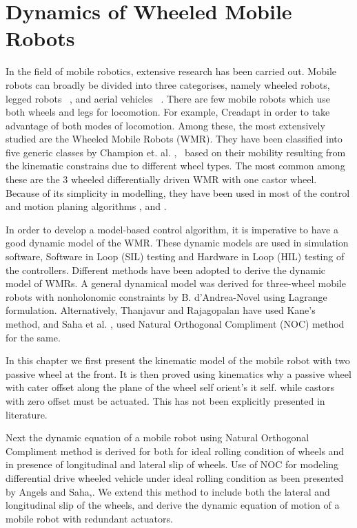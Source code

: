 \chapter{Dynamics of Wheeled Mobile Robots }
\label{c4_Dynamics}
In the field of mobile robotics, extensive research has been carried out. 
Mobile robots can broadly be divided into three categorises, namely wheeled robots, legged robots ~\cite{machado2006overview}, and aerial vehicles ~\cite{valavanis2014handbook}. 
There are few mobile robots which use both wheels and legs for locomotion. For example,  Creadapt  \cite{mouret2015evolutionary} in order to take advantage of both modes of locomotion. 
Among these, the most extensively studied are the  Wheeled Mobile Robots (WMR). 
They have been classified into five generic classes by Champion et. al. \cite{campion1996structural},~\cite{campion2008wheeled}  based on their mobility resulting from the kinematic constrains due to  different wheel types.
 The most common among these are the  3 wheeled differentially driven WMR with one castor wheel.
  Because of its simplicity in modelling, they have been used in most of the  control and motion planing algorithms  \cite{desantis1995modeling}, \cite{koh1999smooth} and \cite{d1995control}. 

In order to develop a model-based control algorithm, it is imperative to have a good dynamic model of the WMR.
 These dynamic models are used in  simulation software,  Software in Loop (SIL) testing and Hardware in Loop (HIL) testing  of the controllers.
 Different methods have  been adopted to derive the dynamic model of WMRs.
  A general dynamical model was derived for three-wheel mobile robots with nonholonomic constraints  by B. d'Andrea-Novel \cite{d1991modelling} using  Lagrange formulation.
    Alternatively, Thanjavur and Rajagopalan \cite{thanjavur1997ease} have used Kane's method,  and  Saha et al. \cite{saha1991dynamics},\cite{saha1989kinematics} used Natural Orthogonal Compliment (NOC) method for the same.  
    
In this chapter we first present the kinematic model of the mobile robot with two passive wheel at the front. It is then proved using kinematics why a passive wheel with cater offset along the plane of the wheel self orient's it self. while  castors with zero offset  must be actuated.  This has not been explicitly presented in literature.

 Next the dynamic equation of a mobile robot using Natural Orthogonal Compliment method is derived for both for ideal rolling condition of wheels and in presence of longitudinal and lateral slip of wheels. Use of NOC for modeling differential drive wheeled vehicle under ideal rolling condition as been presented by Angels and Saha\cite{saha1991dynamics},\cite{saha1989kinematics}. We extend this method to include both the lateral and longitudinal slip of the wheels, and  derive the dynamic equation of motion of a mobile robot with redundant actuators. 
 
